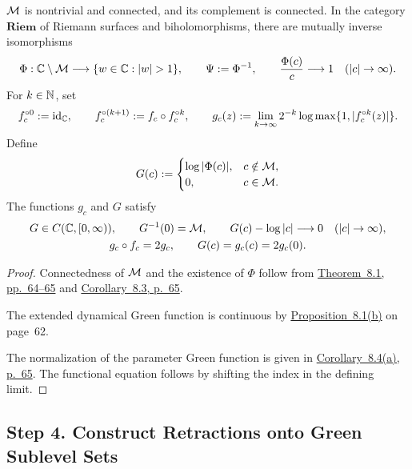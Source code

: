 \begin{theorem}
\label{thm:external-conformal-map}
\(\mathcal M\) is nontrivial and connected, and its complement is connected.
In the category \(\mathbf{Riem}\) of Riemann surfaces and
biholomorphisms, there are mutually inverse isomorphisms
\[
 \Phi:\C\setminus\M\longrightarrow\{w\in\C:|w|>1\},
 \qquad \Psi:=\Phi^{-1},\qquad
 \frac{\Phi(c)}{c}\longrightarrow1\quad(|c|\to\infty).
\]
For \(k\in\mathbb N\), set
\[
 f_c^{\circ0}:=\operatorname{id}_{\mathbb C},\qquad
 f_c^{\circ(k+1)}:=f_c\circ f_c^{\circ k},\qquad
 g_c(z):=\lim_{k\to\infty}2^{-k}
             \log\max\{1,|f_c^{\circ k}(z)|\}.
\]
Define
\[
 G(c):=
 \begin{cases}
  \log|\Phi(c)|,&c\notin\mathcal M,\\
  0,&c\in\mathcal M.
 \end{cases}
\]
The functions \(g_c\) and \(G\) satisfy
 \begin{gather}
  G\in C(\mathbb C,[0,\infty)),\qquad G^{-1}(0)=\mathcal M,\qquad
  G(c)-\log|c|\longrightarrow0\quad(|c|\to\infty),\label{eq:green}\\
  g_c\circ f_c=2g_c,\qquad G(c)=g_c(c)=2g_c(0).
 \label{eq:green-normalization}
 \end{gather}
\end{theorem}
\begin{proof}
Connectedness of \(\mathcal M\) and the existence of \(\Phi\) follow from
\href{https://pi.math.cornell.edu/~hubbard/OrsayEnglish.pdf#page=64}
{Theorem~8.1, pp.~64--65} and
\href{https://pi.math.cornell.edu/~hubbard/OrsayEnglish.pdf#page=65}
{Corollary~8.3, p.~65}.\par
The extended dynamical Green function is continuous by
\href{https://pi.math.cornell.edu/~hubbard/OrsayEnglish.pdf#page=62}
{Proposition~8.1(b)} on page~62.\par
The normalization of the parameter Green function is given in
\href{https://pi.math.cornell.edu/~hubbard/OrsayEnglish.pdf#page=65}
{Corollary~8.4(a), p.~65}.
The functional equation follows by shifting the index in the defining
limit.
\end{proof}

\subsection{Step 4. Construct Retractions onto Green Sublevel Sets}

